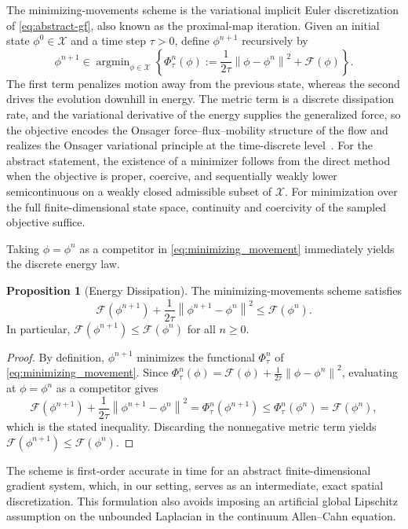 \documentclass[11pt,letterpaper]{article}
\theoremstyle{plain}
\theoremstyle{definition}
\newtheorem{proposition}{Proposition}[section]
\newcommand{\ph}{\phi}%
\newcommand{\phn}{\phi^n}
\newcommand{\phnp}{\phi^{n+1}}%
\newcommand{\norm}[1]{\left\| #1 \right\|}
\newcommand{\E}{\mathcal{F}}
\newcommand{\X}{\mathcal{X}}
\newcommand{\argmin}{\mathop{\mathrm{argmin}}}
\begin{document}
The minimizing-movements scheme is the variational implicit Euler discretization of \eqref{eq:abstract-gf}, also known as the proximal-map iteration. Given an initial state \(\phi^0\in \X\) and a time step \(\tau>0\), define \(\phi^{n+1}\) recursively by
\begin{equation} \label{eq:minimizing_movement}
 \phi^{n+1} \in \argmin_{\phi\in \X}
 \left\{
 \Phi_\tau^n(\phi)
 :=
 \frac{1}{2\tau}\norm{\phi-\phi^n}^2 + \E(\phi)
 \right\}.
\end{equation}
The first term penalizes motion away from the previous state, whereas the second drives the evolution downhill in energy. The metric term is a discrete dissipation rate, and the variational derivative of the energy supplies the generalized force, so the objective encodes the Onsager force--flux--mobility structure of the flow and realizes the Onsager variational principle at the time-discrete level~\cite{wang2020generalized}. For the abstract statement, the existence of a minimizer follows from the direct method when the objective is proper, coercive, and sequentially weakly lower semicontinuous on a weakly closed admissible subset of \(\X\). For minimization over the full finite-dimensional state space, continuity and coercivity of the sampled objective suffice. 


Taking \(\phi=\phn\) as a competitor in \eqref{eq:minimizing_movement} immediately yields the discrete energy law.

\begin{proposition}[Energy Dissipation]
\label{prop:energy_dissipation} The minimizing-movements scheme satisfies
\begin{equation}
\E(\phnp) + \frac{1}{2\tau}\norm{\phnp - \phn}^2 \leq \E(\phn).
\end{equation}
In particular, $\E(\phnp) \leq \E(\phn)$ for all $n \geq 0$.
\end{proposition}

\begin{proof}
By definition, $\phnp$ minimizes the functional $\Phi_\tau^n$ of \eqref{eq:minimizing_movement}. Since $\Phi_\tau^n(\ph)=\E(\ph)+\frac{1}{2\tau}\norm{\ph-\phn}^2$, evaluating at $\ph=\phn$ as a competitor gives
\[
\E(\phnp) + \frac{1}{2\tau}\norm{\phnp - \phn}^2 = \Phi_\tau^n(\phnp) \leq \Phi_\tau^n(\phn) = \E(\phn),
\]
which is the stated inequality. Discarding the nonnegative metric term yields $\E(\phnp)\leq\E(\phn)$.
\end{proof}

The scheme is first-order accurate in time for an abstract finite-dimensional gradient system, which, in our setting, serves as an intermediate, exact spatial discretization. This formulation also avoids imposing an artificial global Lipschitz assumption on the unbounded Laplacian in the continuum Allen--Cahn equation.
\end{document}
